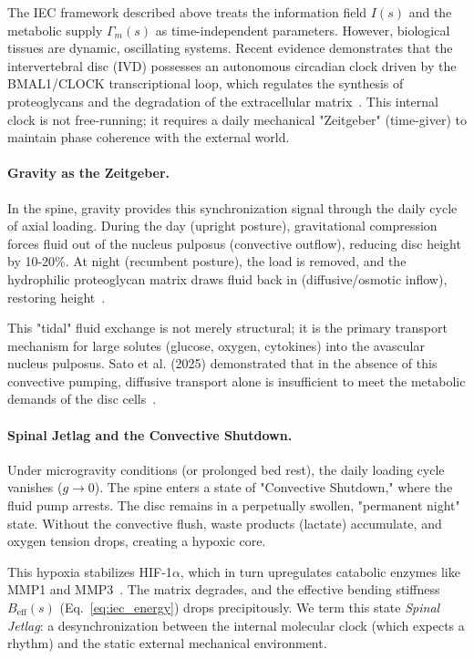 \documentclass[11pt,a4paper]{article}
\begin{document}
The IEC framework described above treats the information field $I(s)$ and the metabolic supply $\Gamma_m(s)$ as time-independent parameters. However, biological tissues are dynamic, oscillating systems. Recent evidence demonstrates that the intervertebral disc (IVD) possesses an autonomous circadian clock driven by the BMAL1/CLOCK transcriptional loop, which regulates the synthesis of proteoglycans and the degradation of the extracellular matrix~\cite{dudek2017clock, takahashi2017clock}. This internal clock is not free-running; it requires a daily mechanical "Zeitgeber" (time-giver) to maintain phase coherence with the external world.

\paragraph{Gravity as the Zeitgeber.} In the spine, gravity provides this synchronization signal through the daily cycle of axial loading. During the day (upright posture), gravitational compression forces fluid out of the nucleus pulposus (convective outflow), reducing disc height by 10-20\%. At night (recumbent posture), the load is removed, and the hydrophilic proteoglycan matrix draws fluid back in (diffusive/osmotic inflow), restoring height~\cite{urban2004nutrition, setton2004ivd}.

This "tidal" fluid exchange is not merely structural; it is the primary transport mechanism for large solutes (glucose, oxygen, cytokines) into the avascular nucleus pulposus. Sato et al. (2025) demonstrated that in the absence of this convective pumping, diffusive transport alone is insufficient to meet the metabolic demands of the disc cells~\cite{sato2025convective}.

\paragraph{Spinal Jetlag and the Convective Shutdown.} Under microgravity conditions (or prolonged bed rest), the daily loading cycle vanishes ($g \to 0$). The spine enters a state of "Convective Shutdown," where the fluid pump arrests. The disc remains in a perpetually swollen, "permanent night" state. Without the convective flush, waste products (lactate) accumulate, and oxygen tension drops, creating a hypoxic core.

This hypoxia stabilizes HIF-1$\alpha$, which in turn upregulates catabolic enzymes like MMP1 and MMP3~\cite{chen2025mmp, roughley2004biology}. The matrix degrades, and the effective bending stiffness $B_{\mathrm{eff}}(s)$ (Eq.~\ref{eq:iec_energy}) drops precipitously. We term this state \emph{Spinal Jetlag}: a desynchronization between the internal molecular clock (which expects a rhythm) and the static external mechanical environment.
\end{document}
